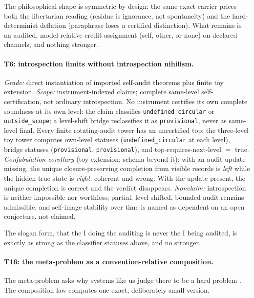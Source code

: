The philosophical shape is symmetric by design: the same exact carrier
prices both the libertarian reading (residue is ignorance, not spontaneity)
and the hard-determinist deflation (paraphrase loses a certified
distinction). What remains is an audited, model-relative credit assignment
(self, other, or none) on declared channels, and nothing stronger.

\paragraph{T6: introspection limits without introspection nihilism.}
\begin{theorem}
\gradeS{} \emph{Grade:} direct instantiation of imported self-audit theorems
plus finite toy extension. \emph{Scope:} instrument-indexed claims; complete
same-level self-certification, not ordinary introspection. No instrument
certifies its own complete soundness at its own level: the claim classifies
\texttt{undefined\_circular} or \texttt{outside\_scope}; a level-shift bridge
reclassifies it as \texttt{provisional}, never as same-level final. Every
finite rotating-audit tower has an uncertified top: the three-level toy tower
computes own-level statuses (\texttt{undefined\_circular} at each level),
bridge statuses (\texttt{provisional}, \texttt{provisional}), and
top-requires-next-level $=$ true. \emph{Confabulation corollary} (toy
extension; schema beyond it): with an audit update missing, the unique
closure-preserving completion from visible records is \emph{left} while the
hidden true state is \emph{right}: coherent and wrong. With the update
present, the unique completion is correct and the verdict disappears.
\emph{Nonclaim:} introspection is neither impossible nor worthless; partial,
level-shifted, bounded audit remains admissible, and self-image stability
over time is named as dependent on an open conjecture, not claimed.
\end{theorem}

The slogan form, that the I doing the auditing is never the I being audited,
is exactly as strong as the classifier statuses above, and no stronger.

\paragraph{T16: the meta-problem as a convention-relative composition.}
The meta-problem asks why systems like us judge there to be a hard problem
\citep{Chalmers2018MetaProblem}. The composition law computes one exact,
deliberately small version.

